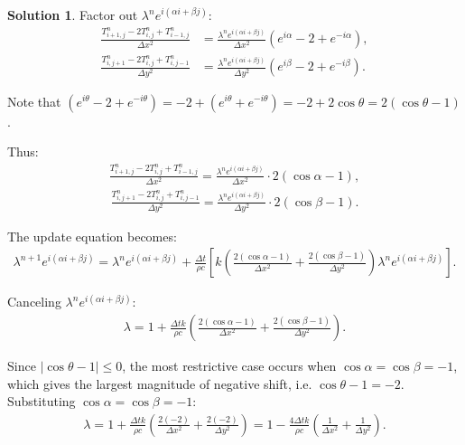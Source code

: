\documentclass[12pt]{article}
\theoremstyle{definition} %
\newtheorem{solution}{Solution}
\theoremstyle{plain} %
\begin{document}
\begin{solution}
\noindent Factor out $\lambda^n e^{i(\alpha i + \beta j)}$:
\begin{align*}
\frac{T_{i+1,j}^n - 2T_{i,j}^n + T_{i-1,j}^n}{\Delta x^2} &= \frac{\lambda^n e^{i(\alpha i + \beta j)}}{\Delta x^2} (e^{i\alpha} - 2 + e^{-i\alpha}), \\
\frac{T_{i,j+1}^n - 2T_{i,j}^n + T_{i,j-1}^n}{\Delta y^2} &= \frac{\lambda^n e^{i(\alpha i + \beta j)}}{\Delta y^2} (e^{i\beta} - 2 + e^{-i\beta}).
\end{align*}

\noindent Note that $(e^{i\theta} - 2 + e^{-i\theta}) = -2 + (e^{i\theta} + e^{-i\theta}) = -2 + 2\cos\theta = 2(\cos\theta - 1)$.

\noindent Thus:
\begin{align}
\frac{T_{i+1,j}^n - 2T_{i,j}^n + T_{i-1,j}^n}{\Delta x^2} = \frac{\lambda^n e^{i(\alpha i + \beta j)}}{\Delta x^2} \cdot 2(\cos\alpha - 1),
\end{align}
\begin{align}
\frac{T_{i,j+1}^n - 2T_{i,j}^n + T_{i,j-1}^n}{\Delta y^2} = \frac{\lambda^n e^{i(\alpha i + \beta j)}}{\Delta y^2} \cdot 2(\cos\beta - 1).
\end{align}

\noindent The update equation becomes:
\begin{align}
\lambda^{n+1} e^{i(\alpha i + \beta j)} = \lambda^n e^{i(\alpha i + \beta j)} + \frac{\Delta t}{\rho c} \left[ k \left( \frac{2(\cos\alpha - 1)}{\Delta x^2} + \frac{2(\cos\beta - 1)}{\Delta y^2} \right)\lambda^n e^{i(\alpha i + \beta j)} \right].
\end{align}

\noindent Canceling $\lambda^n e^{i(\alpha i + \beta j)}$:
\begin{align}
\lambda = 1 + \frac{\Delta t k}{\rho c}\left( \frac{2(\cos\alpha - 1)}{\Delta x^2} + \frac{2(\cos\beta - 1)}{\Delta y^2}\right).
\end{align}

\noindent Since $|\cos\theta - 1| \leq 0$, the most restrictive case occurs when $\cos\alpha = \cos\beta = -1$, which gives the largest magnitude of negative shift, i.e. $\cos\theta - 1 = -2$. Substituting $\cos\alpha = \cos\beta = -1$:
\begin{align}
\lambda = 1 + \frac{\Delta t k}{\rho c}\left(\frac{2(-2)}{\Delta x^2} + \frac{2(-2)}{\Delta y^2}\right) = 1 - \frac{4\Delta t k}{\rho c}\left( \frac{1}{\Delta x^2} + \frac{1}{\Delta y^2}\right).
\end{align}


\end{solution}
\end{document}
